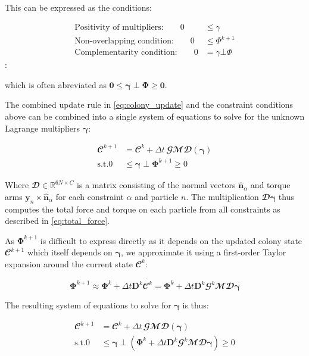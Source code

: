 \documentclass[conference]{IEEEtran}
\begin{document}
This can be expressed as the conditions:

\begin{align}
    \text{Positivity of multipliers:} \qquad  0 & \leq \gamma        \\
    \text{Non-overlapping condition:} \qquad  0 & \leq \Phi^{k+1}    \\
    \text{Complementarity condition:} \qquad  0 & = \gamma \bot \Phi
\end{align}:

which is often abreviated as $\mathbf{0} \leq \mathbf{\gamma} \perp \mathbf{\Phi} \geq \mathbf{0}$.


The combined update rule in \autoref{eq:colony_update} and the constraint conditions above can be combined into a single system of equations to solve for the unknown Lagrange multipliers $\mathbf{\gamma}$:

\begin{align}
    \mathbfcal{C}^{k+1} & = \mathbfcal{C}^k + \Delta t \, \mathbfcal{G}\mathbfcal{M} \mathbfcal{D}(\mathbf{\gamma}) \\
    \text{s.t.} 0       & \leq \mathbf{\gamma} \perp \mathbf{\Phi}^{k+1} \geq 0
\end{align}

Where $\mathbfcal{D} \in \mathbb{R}^{6N \times C}$ is a matrix consisting of the normal vectors $\hat{\mathbf{n}}_\alpha$ and torque arms $\mathbf{y}_n \times \hat{\mathbf{n}}_\alpha$ for each constraint $\alpha$ and particle $n$. The multiplication $\mathbfcal{D}\mathbf{\gamma}$ thus computes the total force and torque on each particle from all constraints as described in \autoref{eq:total_force}.


As $\mathbf{\Phi}^{k+1}$ is difficult to express directly as it depends on the updated colony state $\mathbfcal{C}^{k+1}$ which itself depends on $\mathbf{\gamma}$, we approximate it using a first-order Taylor expansion around the current state $\mathbfcal{C}^k$:

$$
    \mathbf{\Phi}^{k+1} \approx \mathbf{\Phi}^k + \Delta t \mathbf{D}^k \dot{\mathbfcal{C}^k} = \mathbf{\Phi}^k + \Delta t \mathbf{D}^k \mathbfcal{G}^k \mathbfcal{M} \mathbfcal{D} \mathbf{\gamma}
$$

The resulting system of equations to solve for $\mathbf{\gamma}$ is thus:

\begin{align}
    \mathbfcal{C}^{k+1} & = \mathbfcal{C}^k + \Delta t \, \mathbfcal{G}\mathbfcal{M} \mathbfcal{D}(\mathbf{\gamma})                                                            \\
    \text{s.t.} 0       & \leq \mathbf{\gamma} \perp \left( \mathbf{\Phi}^k + \Delta t \mathbf{D}^k \mathbfcal{G}^k \mathbfcal{M} \mathbfcal{D} \mathbf{\gamma} \right) \geq 0
\end{align}
\end{document}
